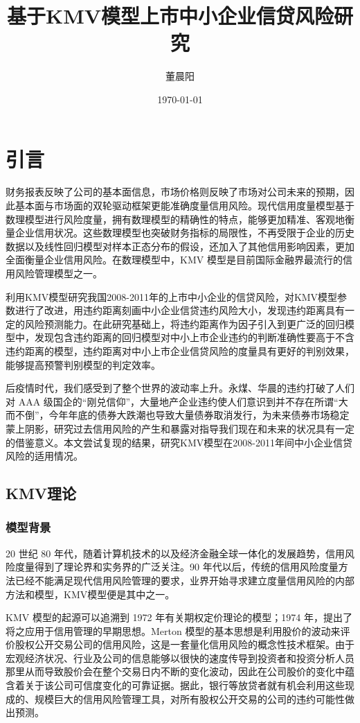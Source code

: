 \documentclass[a4paper,12pt]{ctexart}
\title{基于KMV模型上市中小企业信贷风险研究}
\author{董晨阳}
\date{\today}
\begin{document}
\maketitle
\tableofcontents
\clearpage
\section{引言}

财务报表反映了公司的基本面信息，市场价格则反映了市场对公司未来的预期，因此基本面与市场面的双轮驱动框架更能准确度量信用风险。现代信用度量模型基于数理模型进行风险度量，拥有数理模型的精确性的特点，能够更加精准、客观地衡量企业信用状况。这些数理模型也突破财务指标的局限性，不再受限于企业的历史数据以及线性回归模型对样本正态分布的假设，还加入了其他信用影响因素，更加全面衡量企业信用风险。在数理模型中，KMV 模型是目前国际金融界最流行的信用风险管理模型之一。

\citet{彭伟2012基于}利用KMV模型研究我国2008-2011年的上市中小企业的信贷风险，对KMV模型参数进行了改进，用违约距离刻画中小企业信贷违约风险大小，发现违约距离具有一定的风险预测能力。在此研究基础上，\citet{彭伟2012我国上市中小企业信贷风险研究}将违约距离作为因子引入到更广泛的回归模型中，发现包含违约距离的回归模型对中小上市企业违约的判断准确性要高于不含违约距离的模型，违约距离对中小上市企业信贷风险的度量具有更好的判别效果，能够提高预警判别模型的判定效率。

后疫情时代，我们感受到了整个世界的波动率上升。永煤、华晨的违约打破了人们对 AAA 级国企的“刚兑信仰”，大量地产企业违约使人们意识到并不存在所谓“大而不倒”，今年年底的债券大跌潮也导致大量债券取消发行，为未来债券市场稳定蒙上阴影，研究过去信用风险的产生和暴露对指导我们现在和未来的状况具有一定的借鉴意义。本文尝试复现\citet{彭伟2012基于}的结果，研究KMV模型在2008-2011年间中小企业信贷风险的适用情况。

\subsection{KMV理论}
\subsubsection{模型背景}
20 世纪 80 年代，随着计算机技术的以及经济金融全球一体化的发展趋势，信用风险度量得到了理论界和实务界的广泛关注。90 年代以后，传统的信用风险度量方法已经不能满足现代信用风险管理的要求，业界开始寻求建立度量信用风险的内部方法和模型，KMV模型便是其中之一。

KMV 模型的起源可以追溯到 1972 年\citet{black1973pricing}有关期权定价理论的模型；1974 年，\citeauthor{merton1974pricing}提出了将之应用于信用管理的早期思想。Merton 模型的基本思想是利用股价的波动来评价股权公开交易公司的信用风险，这是一套量化信用风险的概念性技术框架。由于宏观经济状况、行业及公司的信息能够以很快的速度传导到投资者和投资分析人员那里从而导致股价会在整个交易日内不断的变化波动，因此在公司股价的变化中蕴含着关于该公司可信度变化的可靠证据。据此，银行等放贷者就有机会利用这些现成的、规模巨大的信用风险管理工具，对所有股权公开交易的公司的违约可能性做出预测。
\end{document}
